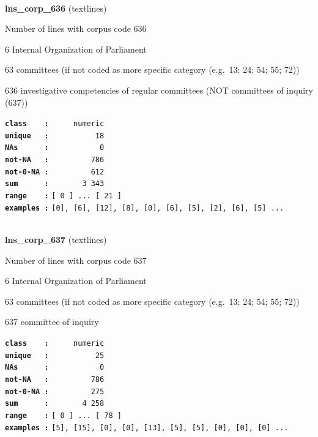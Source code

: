\documentclass[]{article}
\begin{document}
~

\textbf{lns\_corp\_636} (textlines)

Number of lines with corpus code 636

6 Internal Organization of Parliament

63 committees (if not coded as more specific category (e.g.~13; 24; 54;
55; 72))

636 investigative competencies of regular committees (NOT committees of
inquiry (637))

\textbf{\texttt{class\ \ \ \ :}} \texttt{~~~~~numeric}\\
\textbf{\texttt{unique\ \ \ :}} \texttt{~~~~~~~~~~18}\\
\textbf{\texttt{NAs\ \ \ \ \ \ :}} \texttt{~~~~~~~~~~~0}\\
\textbf{\texttt{not-NA\ \ \ :}} \texttt{~~~~~~~~~786}\\
\textbf{\texttt{not-0-NA\ :}} \texttt{~~~~~~~~~612}\\
\textbf{\texttt{sum\ \ \ \ \ \ :}} \texttt{~~~~~~~3~343}\\
\textbf{\texttt{range\ \ \ \ :}}
\texttt{{[}\ 0\ {]}\ ...\ {[}\ 21\ {]}}\\
\textbf{\texttt{examples\ :}}
\texttt{{[}0{]},\ {[}6{]},\ {[}12{]},\ {[}8{]},\ {[}0{]},\ {[}6{]},\ {[}5{]},\ {[}2{]},\ {[}6{]},\ {[}5{]}\ ...}\\

~

\textbf{lns\_corp\_637} (textlines)

Number of lines with corpus code 637

6 Internal Organization of Parliament

63 committees (if not coded as more specific category (e.g.~13; 24; 54;
55; 72))

637 committee of inquiry

\textbf{\texttt{class\ \ \ \ :}} \texttt{~~~~~numeric}\\
\textbf{\texttt{unique\ \ \ :}} \texttt{~~~~~~~~~~25}\\
\textbf{\texttt{NAs\ \ \ \ \ \ :}} \texttt{~~~~~~~~~~~0}\\
\textbf{\texttt{not-NA\ \ \ :}} \texttt{~~~~~~~~~786}\\
\textbf{\texttt{not-0-NA\ :}} \texttt{~~~~~~~~~275}\\
\textbf{\texttt{sum\ \ \ \ \ \ :}} \texttt{~~~~~~~4~258}\\
\textbf{\texttt{range\ \ \ \ :}}
\texttt{{[}\ 0\ {]}\ ...\ {[}\ 78\ {]}}\\
\textbf{\texttt{examples\ :}}
\texttt{{[}5{]},\ {[}15{]},\ {[}0{]},\ {[}0{]},\ {[}13{]},\ {[}5{]},\ {[}5{]},\ {[}0{]},\ {[}0{]},\ {[}0{]}\ ...}\\
\end{document}
